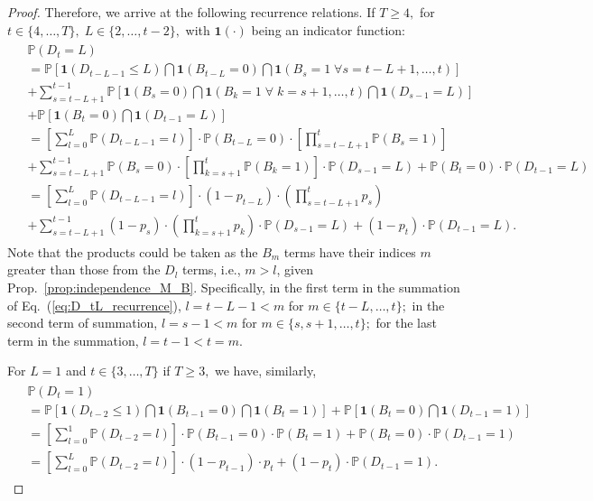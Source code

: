 \documentclass{article}
\theoremstyle{plain}
\theoremstyle{definition}
\theoremstyle{remark}
\begin{document}
\begin{proof}
Therefore, we arrive at the following recurrence relations. If $T\geq 4,$ for $t\in\{4, \dots, T\},\;L\in\{2, \dots, t-2\},$ with $\mathbf{1}(\cdot)$ being an indicator function:
\begin{align}
\begin{split}
\label{eq:D_tL_recurrence}
   & \mathbb{P}(D_t=L) \\ & =  \mathbb{P}\left[\mathbf{1}(D_{t-L-1}\leq L) \bigcap \mathbf{1}(B_{t-L}=0)\bigcap \mathbf{1}(B_s=1\;\forall s=t-L+1, \dots, t)\right]\\
    &+ \sum_{s=t-L+1}^{t-1}\mathbb{P}\left[\mathbf{1}\left(B_s=0\right)\bigcap \mathbf{1}\left(B_k=1\;\forall \;k=s+1, \dots, t\right)\bigcap \mathbf{1}\left(D_{s-1}=L\right)\right]\\
    &+ \mathbb{P}\left[\mathbf{1}\left(B_t=0\right)\bigcap \mathbf{1}\left(D_{t-1}=L\right)\right]\\
    &= \left[\sum_{l=0}^{L}\mathbb{P}(D_{t-L-1}=l)\right]\cdot\mathbb{P}(B_{t-L}=0)\cdot\left[\prod_{s=t-L+1}^t \mathbb{P}(B_s=1)\right]\\
    &+ \sum_{s=t-L+1}^{t-1}\mathbb{P}(B_s=0)\cdot\left[\prod_{k=s+1}^t \mathbb{P}(B_k=1)\right]\cdot\mathbb{P}(D_{s-1}=L) + \mathbb{P}(B_t=0)\cdot \mathbb{P}(D_{t-1}=L)\\
    &= \left[\sum_{l=0}^{L}\mathbb{P}(D_{t-L-1}=l)\right]\cdot(1-p_{t-L})\cdot\left(\prod_{s=t-L+1}^t p_s\right)\\
    &+ \sum_{s=t-L+1}^{t-1}(1-p_s)\cdot\left(\prod_{k=s+1}^t p_k\right)\cdot\mathbb{P}(D_{s-1}=L) + (1-p_t)\cdot \mathbb{P}(D_{t-1}=L).
\end{split}
\end{align}
Note that the products could be taken as the $B_m$ terms have their indices $m$ greater than those from the $D_l$ terms, i.e., $m>l$, given Prop.~\ref{prop:independence_M_B}. 
Specifically, in the first term in the summation of Eq.~(\ref{eq:D_tL_recurrence}), $l=t-L-1<m$ for $m\in\{t-L, \dots, t\};$ in the second term of summation, $l=s-1<m$ for $m\in\{s, s+1, \dots, t\};$ for the last term in the summation, $l=t-1<t=m.$

For $L=1$ and $t\in\{3, \dots, T\}$ if $T\geq 3,$ we have, similarly,
\begin{align}
\begin{split}
    &\mathbb{P}(D_t=1) \\
    &= \mathbb{P}\left[\mathbf{1}(D_{t-2}\leq 1) \bigcap \mathbf{1}(B_{t-1}=0)\bigcap \mathbf{1}(B_t=1)\right] + \mathbb{P}\left[\mathbf{1}\left(B_t=0\right)\bigcap \mathbf{1}\left(D_{t-1}=1\right)\right]\\
    &= \left[\sum_{l=0}^{1}\mathbb{P}(D_{t-2}=l)\right]\cdot\mathbb{P}(B_{t-1}=0)\cdot\mathbb{P}(B_t=1) + \mathbb{P}(B_t=0)\cdot \mathbb{P}(D_{t-1}=1)\\
    &= \left[\sum_{l=0}^{L}\mathbb{P}(D_{t-2}=l)\right]\cdot(1-p_{t-1})\cdot p_t + (1-p_t)\cdot \mathbb{P}(D_{t-1}=1).
\end{split}
\end{align}


\end{proof}
\end{document}
